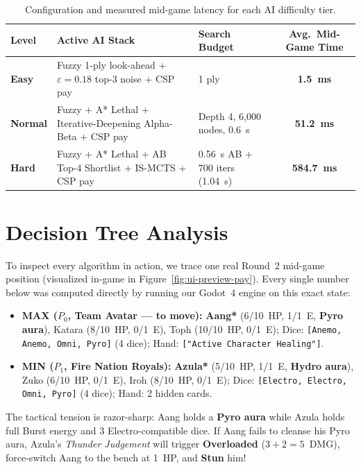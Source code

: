 \documentclass[11pt,a4paper]{article}
\begin{document}
\begin{table}[H]
\centering
\caption{Configuration and measured mid-game latency for each AI difficulty tier.}
\label{tab:difficulty-speed}
\small
\begin{tabularx}{\textwidth}{@{}L{1.45cm} Y L{4.2cm} c@{}}
\toprule
Level & Active AI Stack & Search Budget & Avg.\ Mid-Game Time \\
\midrule
\textbf{Easy} & Fuzzy 1-ply look-ahead + $\varepsilon=0.18$ top-3 noise + CSP pay & 1 ply & \textbf{1.5~ms} \\
\textbf{Normal} & Fuzzy + A* Lethal + Iterative-Deepening Alpha-Beta + CSP pay & Depth 4, 6{,}000 nodes, 0.6~s & \textbf{51.2~ms} \\
\textbf{Hard} & Fuzzy + A* Lethal + AB Top-4 Shortlist + IS-MCTS + CSP pay & 0.56~s AB + 700 iters (1.04~s) & \textbf{584.7~ms} \\
\bottomrule
\end{tabularx}
\end{table}

\section{Decision Tree Analysis}
\label{sec:tree}

To inspect every algorithm in action, we trace one real Round~2 mid-game position (visualized in-game in Figure~\ref{fig:ui-preview-pay}). Every single number below was computed directly by running our Godot~4 engine on this exact state:
\begin{itemize}[leftmargin=1.4em, itemsep=1pt]
  \item \textbf{MAX ($P_0$, Team Avatar — to move):} \textbf{Aang*} (6/10~HP, 1/1~E, \textbf{Pyro aura}), Katara (8/10~HP, 0/1~E), Toph (10/10~HP, 0/1~E); Dice: \texttt{[Anemo, Anemo, Omni, Pyro]} (4 dice); Hand: \texttt{["Active Character Healing"]}.
  \item \textbf{MIN ($P_1$, Fire Nation Royals):} \textbf{Azula*} (5/10~HP, 1/1~E, \textbf{Hydro aura}), Zuko (6/10~HP, 0/1~E), Iroh (8/10~HP, 0/1~E); Dice: \texttt{[Electro, Electro, Omni, Pyro]} (4 dice); Hand: 2 hidden cards.
\end{itemize}
The tactical tension is razor-sharp: Aang holds a \textbf{Pyro aura} while Azula holds full Burst energy and 3 Electro-compatible dice. If Aang fails to cleanse his Pyro aura, Azula's \emph{Thunder Judgement} will trigger \textbf{Overloaded} ($3 + 2 = 5$~DMG), force-switch Aang to the bench at 1~HP, and \textbf{Stun} him!
\end{document}
